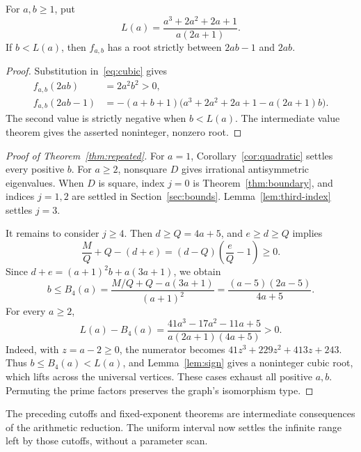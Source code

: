 \begin{lemma}
\label{lem:sign}
For $a,b\geq1$, put
\[
L(a)=\frac{a^3+2a^2+2a+1}{a(2a+1)}.
\]
If $b<L(a)$, then $f_{a,b}$ has a root strictly between $2ab-1$ and $2ab$.
\end{lemma}
\begin{proof}
Substitution in~\eqref{eq:cubic} gives
\begin{align*}
f_{a,b}(2ab)&=2a^2b^2>0,\\
f_{a,b}(2ab-1)&=-(a+b+1)
\bigl(a^3+2a^2+2a+1-a(2a+1)b\bigr).
\end{align*}
The second value is strictly negative when $b<L(a)$. The intermediate
value theorem gives the asserted noninteger, nonzero root.
\end{proof}

\begin{proof}[Proof of Theorem~\ref{thm:repeated}]
For $a=1$, Corollary~\ref{cor:quadratic} settles every positive $b$.
For $a\geq2$, nonsquare $D$ gives irrational antisymmetric eigenvalues.
When $D$ is square, index $j=0$ is Theorem~\ref{thm:boundary},
and indices $j=1,2$ are settled in Section~\ref{sec:bounds}.
Lemma~\ref{lem:third-index} settles $j=3$.

It remains to consider $j\geq4$. Then $d\geq Q=4a+5$, and
$e\geq d\geq Q$ implies
\[
\frac MQ+Q-(d+e)=(d-Q)\left(\frac eQ-1\right)\geq0.
\]
Since $d+e=(a+1)^2b+a(3a+1)$, we obtain
\[
b\leq B_4(a)=\frac{M/Q+Q-a(3a+1)}{(a+1)^2}
=\frac{(a-5)(2a-5)}{4a+5}.
\]
For every $a\geq2$,
\[
L(a)-B_4(a)=
\frac{41a^3-17a^2-11a+5}{a(2a+1)(4a+5)}>0.
\]
Indeed, with $z=a-2\geq0$, the numerator becomes
$41z^3+229z^2+413z+243$. Thus $b\leq B_4(a)<L(a)$, and
Lemma~\ref{lem:sign} gives a noninteger cubic root, which lifts across
the universal vertices. These cases exhaust all positive $a,b$.
Permuting the prime factors preserves the graph's isomorphism type.
\end{proof}

The preceding cutoffs and fixed-exponent theorems are intermediate
consequences of the arithmetic reduction. The uniform interval now
settles the infinite range left by those cutoffs, without a parameter scan.
